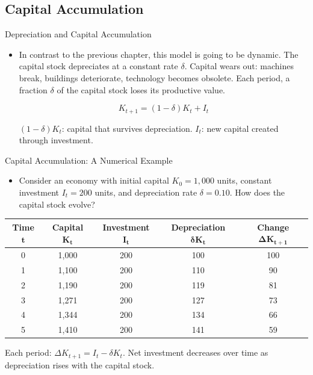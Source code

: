 \documentclass[10pt,aspectratio=169]{beamer}
\begin{document}
\subsection{Capital Accumulation}
\begin{frame}{Depreciation and Capital Accumulation}

\begin{itemize}
\item In contrast to the previous chapter, this model is going to be dynamic.
\itemvso The capital stock depreciates at a constant rate \(\delta\).
    \itemvso Capital wears out: machines break, buildings deteriorate, technology becomes obsolete.
    \itemvso Each period, a fraction \(\delta\) of the capital stock loses its productive value.

\[
    K_{t+1} = (1 - \delta)K_t + I_t
\]

    \itemvso \((1 - \delta)K_t\): capital that survives depreciation.
    \itemvso \(I_t\): new capital created through investment.
\end{itemize}

\end{frame}
\begin{frame}{Capital Accumulation: A Numerical Example}

\begin{itemize}
    \item Consider an economy with initial capital $K_0 = 1,000$ units, constant investment $I_t = 200$ units, and depreciation rate $\delta = 0.10$.
    \itemvso How does the capital stock evolve?
\end{itemize}

\vspace{0.3cm}

\begin{center}
\begin{tabular}{ccccc}
\toprule
\textbf{Time } $\mathbf{t}$ & \textbf{Capital } $\mathbf{K_t}$ & \textbf{Investment } $\mathbf{I_t}$ & \textbf{Depreciation } $\boldsymbol{\delta K_t}$ & \textbf{Change } $\boldsymbol{\Delta K_{t+1}}$ \\
\midrule
0 & 1,000 & 200 & 100 & 100 \\
1 & 1,100 & 200 & 110 & 90 \\
2 & 1,190 & 200 & 119 & 81 \\
3 & 1,271 & 200 & 127 & 73 \\
4 & 1,344 & 200 & 134 & 66 \\
5 & 1,410 & 200 & 141 & 59 \\
\bottomrule
\end{tabular}
\end{center}

\vspace{0.3cm}

\begin{itemize}
    \itemvso Each period: $\Delta K_{t+1} = I_t - \delta K_t$.
    \itemvso Net investment decreases over time as depreciation rises with the capital stock.
\end{itemize}

\end{frame}
\end{document}
